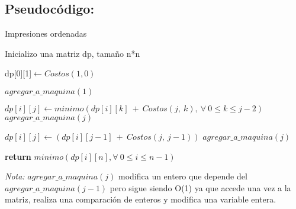 \subsection{Pseudocódigo:}

\begin{algorithm}
\caption{Impresiones ordenadas}\label{ej1}
\begin{algorithmic}[1]
	\State Inicializo una matriz dp, tamaño n*n
	
	\State dp[0][1]$\gets Costos(1,0)$ 
	
	\State $agregar\_a\_maquina(1)$ 
	
	 
				\State $dp[i][j]\gets minimo(dp[i][k]\ +\ Costos(j,\ k),\ \forall\ 0\leq k\leq j-2) $
				\State $agregar\_a\_maquina(j)$
				
			\Else
				\State $dp[i][j]\gets (dp[i][j-1]\ +\ Costos(j,\ j-1))$
				\State $agregar\_a\_maquina(j)$
			\EndIf
		\EndFor
	\EndFor
	
	\State \textbf{return} $minimo(dp[i][n], \forall\ 0\leq i\leq n-1)$ 
	\State {}
\EndProcedure
\end{algorithmic}
\end{algorithm}

\textit{Nota:} $agregar\_a\_maquina(j)$ modifica un entero que depende del $agregar\_a\_maquina(j-1)$ pero sigue siendo O(1) ya que accede una vez a la matriz, realiza una comparación de enteros y modifica una variable entera.\\